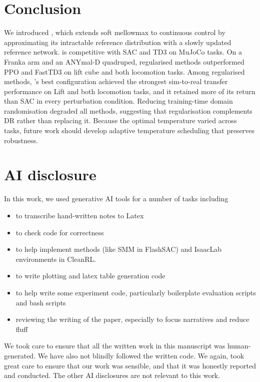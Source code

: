 \documentclass{article} %
\begin{document}
\section{Conclusion}
We introduced \ourMethod, which extends soft mellowmax to continuous control by approximating its intractable reference distribution with a slowly updated reference network. \ourMethod is competitive with SAC and TD3 on MuJoCo tasks. On a Franka arm and an ANYmal-D quadruped, regularised methods outperformed PPO and FastTD3 on lift cube and both locomotion tasks. Among regularised methods, \ourMethod's best configuration achieved the strongest sim-to-real transfer performance on Lift and both locomotion tasks, and it retained more of its return than SAC in every perturbation condition. 
Reducing training-time domain randomisation degraded all methods, suggesting that regularisation complements DR rather than replacing it. 
Because the optimal temperature varied across tasks, future work should develop adaptive temperature scheduling that preserves robustness.






\clearpage
\section{AI disclosure}
In this work, we used generative AI tools for a number of tasks including
\begin{itemize}[nosep]
    \item to transcribe hand-written notes to Latex
    \item to check code for correctness
    \item to help implement methods (like SMM in FlashSAC) and IsaacLab environments in CleanRL.
    \item to write plotting and latex table generation code
    \item to help write some experiment code, particularly boilerplate evaluation scripts and bash scripts
    \item reviewing the writing of the paper, especially to focus narratives and reduce fluff
\end{itemize}

We took care to ensure that all the written work in this manuscript was human-generated. We have also not blindly followed the written code. We again, took great care to ensure that our work was sensible, and that it was honestly reported and conducted. The other AI disclosures are not relevant to this work.
\end{document}
